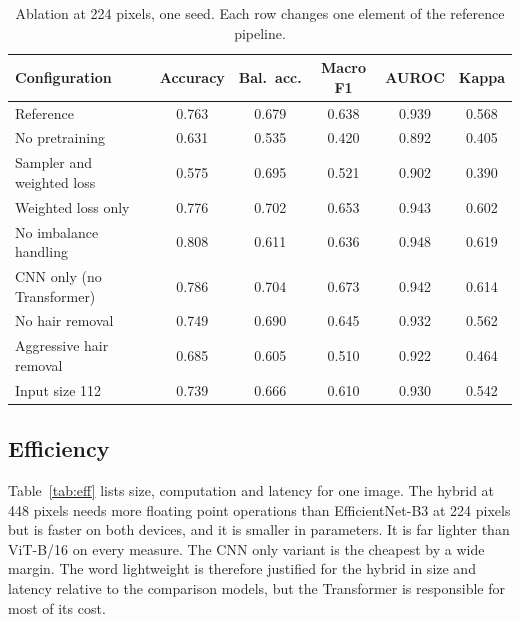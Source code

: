 \documentclass[runningheads]{llncs}
\begin{document}
\begin{table}[!htbp]
\centering
\caption{Ablation at 224 pixels, one seed. Each row changes one element of the reference pipeline.}
\label{tab:ablation}
\small\setlength{\tabcolsep}{4pt}
\begin{tabular}{lccccc}
\toprule
Configuration & Accuracy & Bal.\ acc. & Macro F1 & AUROC & Kappa \\
\midrule
Reference                    & 0.763 & 0.679 & 0.638 & 0.939 & 0.568 \\
No pretraining               & 0.631 & 0.535 & 0.420 & 0.892 & 0.405 \\
Sampler and weighted loss    & 0.575 & 0.695 & 0.521 & 0.902 & 0.390 \\
Weighted loss only           & 0.776 & 0.702 & 0.653 & 0.943 & 0.602 \\
No imbalance handling        & 0.808 & 0.611 & 0.636 & 0.948 & 0.619 \\
CNN only (no Transformer)    & 0.786 & 0.704 & 0.673 & 0.942 & 0.614 \\
No hair removal              & 0.749 & 0.690 & 0.645 & 0.932 & 0.562 \\
Aggressive hair removal      & 0.685 & 0.605 & 0.510 & 0.922 & 0.464 \\
Input size 112               & 0.739 & 0.666 & 0.610 & 0.930 & 0.542 \\
\bottomrule
\end{tabular}
\end{table}

\subsection{Efficiency}

Table~\ref{tab:eff} lists size, computation and latency for one image. The hybrid at 448 pixels needs more floating point operations than EfficientNet-B3 at 224 pixels but is faster on both devices, and it is smaller in parameters. It is far lighter than ViT-B/16 on every measure. The CNN only variant is the cheapest by a wide margin. The word lightweight is therefore justified for the hybrid in size and latency relative to the comparison models, but the Transformer is responsible for most of its cost.
\end{document}
